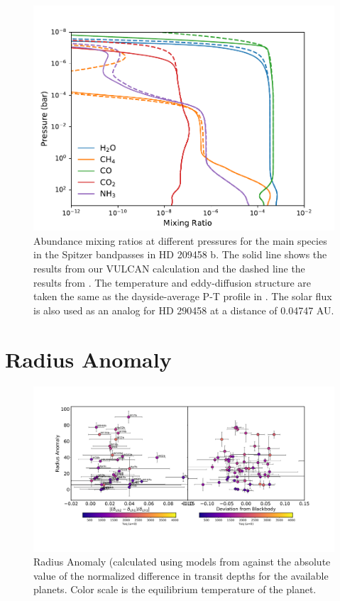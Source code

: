 \begin{subappendices}
  \begin{figure}
      \centering
      \includegraphics[width = \linewidth]{HD209-referee.pdf}
      \caption{Abundance mixing ratios at different pressures for the main species in the Spitzer bandpasses in HD 209458 b. The solid line shows the results from our VULCAN calculation and the dashed line the results from \citet{Moses2011}. The temperature and eddy-diffusion structure are taken the same as the dayside-average P-T profile in \citet{Moses2011}. The solar flux is also used as an analog for HD 290458 at a distance of 0.04747 AU.}
      \label{P1:fig:HD209}
  \end{figure}

  \section{Radius Anomaly}

  \begin{figure}
      \centering
      \includegraphics[width = \textwidth]{RadiusAnomaly.pdf}
      \caption{Radius Anomaly (calculated using models from \citet{Thorngren2016, Thorngren2018} against the absolute value of the normalized difference in transit depths for the available planets. Color scale is the equilibrium temperature of the planet.}
      \label{P1:fig:RadiusAnomaly}
  \end{figure}

\end{subappendices}



